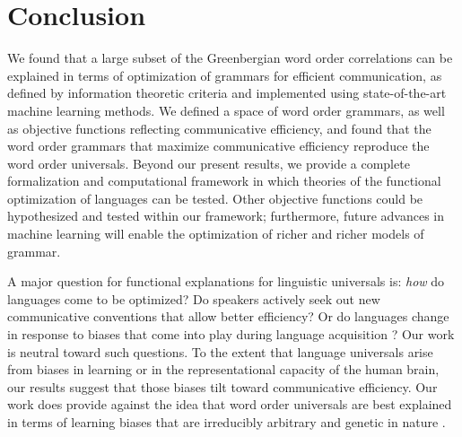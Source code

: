 \documentclass[9pt,twocolumn,twoside,lineno]{pnas-new}
\begin{document}





\section{Conclusion}

We found that a large subset of the Greenbergian word order correlations can be explained in terms of optimization of grammars for efficient communication, as defined by information theoretic criteria and implemented using state-of-the-art machine learning methods. We defined a space of word order grammars, as well as objective functions reflecting communicative efficiency, and found that the word order grammars that maximize communicative efficiency reproduce the word order universals. Beyond our present results, we provide a complete formalization and computational framework in which theories of the functional optimization of languages can be tested. Other objective functions could be hypothesized and tested within our framework; furthermore, future advances in machine learning will enable the optimization of richer and richer models of grammar.

A major question for functional explanations for linguistic universals is: \emph{how} do languages come to be optimized? Do speakers actively seek out new communicative conventions that allow better efficiency? Or do languages change in response to biases that come into play during language acquisition \cite{fedzechkina2012language,culbertson2012learning}? Our work is neutral toward such questions. To the extent that language universals arise from biases in learning or in the representational capacity of the human brain, our results suggest that those biases tilt toward communicative efficiency. Our work does provide against the idea that word order universals are best explained in terms of learning biases that are irreducibly arbitrary and genetic in nature \cite{chomsky2010some}.
\end{document}

